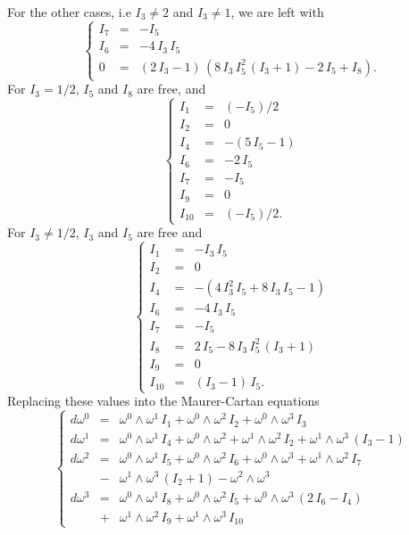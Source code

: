 \noindent
For the other cases, i.e $I_{3} \neq 2$ and $I_{3} \neq 1$, we are left with 
\begin{equation} \left\{
\begin{array}{lll}
I_{7}&=&-I_{5} \\
I_{6}&=&-4\,I_{3}\,I_{5} \\
0&=&(2\,I_{3}-1)\,(8\,I_{3}\,I_{5}^{2}\,(I_{3}+1)-2\,I_{5}+I_{8}).
\end{array} \right.
\end{equation}
For $I_{3}=1/2$, $I_{5}$ and $I_{8}$ are free, and 
\begin{equation} \left\{
\begin{array}{lll}
I_{1}&=&( - I_{5})/2 \\
I_{2}&=&0 \\
I_{4}&=& - (5\,I_{5} - 1) \\
I_{6}&=& - 2\,I_{5} \\
I_{7}&=& - I_{5} \\
I_{9}&=&0 \\
I_{10}&=&( - I_{5})/2.
\end{array} \right.
\end{equation}
For $I_{3} \neq 1/2$, 
$I_{3}$ and $I_{5}$ are free and 
\begin{equation} \left\{
\begin{array}{lll}
I_{1}&=& - I_{3}\,I_{5} \\
I_{2}&=&0 \\
I_{4}&=& - (4\,I_{3}^{2}\,I_{5} + 8\,I_{3}\,I_{5} - 1) \\
I_{6}&=& - 4\,I_{3}\,I_{5} \\
I_{7}&=& - I_{5} \\
I_{8}&=&2\,I_{5}-8\,I_{3}\,I_{5}^{2}\,(I_{3}+1) \\
I_{9}&=&0 \\
I_{10}&=&(I_{3} - 1)\,I_{5}.
\end{array} \right.
\end{equation}
Replacing these values into the Maurer-Cartan equations 
\begin{equation} \left\{ \begin{array}{lll}
d \omega^{0}&=& \omega^{0} \wedge \omega^{1}\,I_{1} 
+ \omega^{0} \wedge \omega^{2}\,I_{2} 
+ \omega^{0} \wedge \omega^{3}\,I_{3} \\
d \omega^{1}&=&\omega^{0} \wedge \omega^{1}\,I_{4} 
+ \omega^{0} \wedge \omega^{2} 
+ \omega^{1} \wedge \omega^{2}\,I_{2} 
+ \omega^{1} \wedge \omega^{3}\,(I_{3} - 1) \\
d \omega^{2}&=&\omega^{0} \wedge \omega^{1}\,I_{5} 
+ \omega^{0} \wedge \omega^{2}\,I_{6} 
+ \omega^{0} \wedge \omega^{3} + \omega^{1} \wedge \omega^{2}\,I_{7} \\
&-& \omega^{1} \wedge \omega^{3}\,(I_{2} + 1) 
- \omega^{2} \wedge \omega^{3} \\
d \omega^{3}&=&\omega^{0} \wedge \omega^{1}\,I_{8} 
+ \omega^{0} \wedge \omega^{2}\,I_{5} 
+ \omega^{0} \wedge \omega^{3}\,(2\,I_{6} - I_{4}) \\
&+& \omega^{1} \wedge \omega^{2}\,I_{9} 
+ \omega^{1} \wedge \omega^{3}\,I_{10}
\end{array} \right.
\end{equation}
